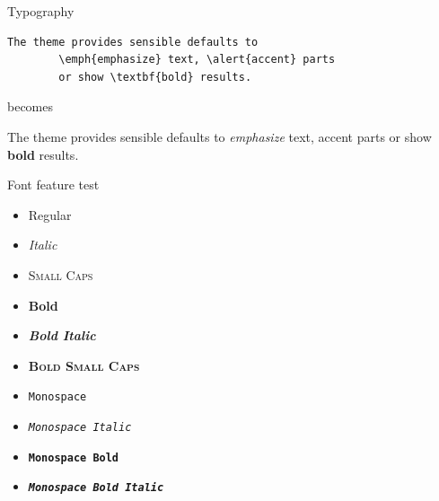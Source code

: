 \begin{frame}[fragile]{Typography}
	\begin{verbatim}The theme provides sensible defaults to
		\emph{emphasize} text, \alert{accent} parts
		or show \textbf{bold} results.\end{verbatim}

				\begin{center}becomes
				\end{center}

				The theme provides sensible defaults to \emph{emphasize} text,
				\alert{accent} parts or show \textbf{bold} results.
\end{frame}

\begin{frame}{Font feature test}
				\begin{itemize}
								\item Regular
								\item \textit{Italic}
								\item \textsc{Small Caps}
								\item \textbf{Bold}
								\item \textbf{\textit{Bold Italic}}
								\item \textbf{\textsc{Bold Small Caps}}
								\item \texttt{Monospace}
								\item \texttt{\textit{Monospace Italic}}
								\item \texttt{\textbf{Monospace Bold}}
								\item \texttt{\textbf{\textit{Monospace Bold Italic}}}
				\end{itemize}
\end{frame}

